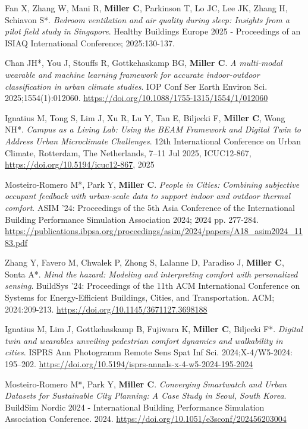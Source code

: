 \documentclass[10pt,a4paper]{article}
\begin{document}
\begin{small}
\begin{etaremune}
\item 
Fan X, Zhang W, Mani R, \textbf{Miller C}, Parkinson T, Lo JC, Lee JK, Zhang H, Schiavon S*. \emph{Bedroom ventilation and air quality during sleep: Insights from a pilot field study in Singapore}. Healthy Buildings Europe 2025 - Proceedings of an ISIAQ International Conference; 2025:130-137.
\item 
Chan JH*, You J, Stouffs R, Gottkehaskamp BG, \textbf{Miller C}. \emph{A multi-modal wearable and machine learning framework for accurate indoor-outdoor classification in urban climate studies}. IOP Conf Ser Earth Environ Sci. 2025;1554(1):012060. \url{https://doi.org/10.1088/1755-1315/1554/1/012060}
\item 
Ignatius M, Tong S, Lim J, Xu R, Lu Y, Tan E, Biljecki F, \textbf{Miller C}, Wong NH*. \emph{Campus as a Living Lab: Using the BEAM Framework and Digital Twin to Address Urban Microclimate Challenges}. 12th International Conference on Urban Climate, Rotterdam, The Netherlands, 7–11 Jul 2025, ICUC12-867, \url{https://doi.org/10.5194/icuc12-867}, 2025
\item 
Mosteiro-Romero M*, Park Y, \textbf{Miller C}. \emph{People in Cities: Combining subjective occupant feedback with urban-scale data to support indoor and outdoor thermal comfort}. ASIM '24: Proceedings of the 5th Asia Conference of the International Building Performance Simulation Association 2024; 2024 pp. 277-284. \url{https://publications.ibpsa.org/proceedings/asim/2024/papers/A18_asim2024_1183.pdf}
\item
Zhang Y, Favero M, Chwalek P, Zhong S, Lalanne D, Paradiso J, \textbf{Miller C}, Sonta A*. \emph{Mind the hazard: Modeling and interpreting comfort with personalized sensing}. BuildSys '24: Proceedings of the 11th ACM International Conference on Systems for Energy-Efficient Buildings, Cities, and Transportation. ACM; 2024:209-213. \url{https://doi.org/10.1145/3671127.3698188}
\item
Ignatius M, Lim J, Gottkehaskamp B, Fujiwara K, \textbf{Miller C}, Biljecki F*.  \emph{Digital twin and wearables unveiling pedestrian comfort dynamics and walkability in cities}. ISPRS Ann Photogramm Remote Sens Spat Inf Sci. 2024;X-4/W5-2024: 195–202. \url{https://doi.org/10.5194/isprs-annals-x-4-w5-2024-195-2024}
\item
Mosteiro-Romero M*, Park Y, \textbf{Miller C}.  \emph{Converging Smartwatch and Urban Datasets for Sustainable City Planning: A Case Study in Seoul, South Korea}. BuildSim Nordic 2024 - International Building Performance Simulation Association Conference. 2024. \url{https://doi.org/10.1051/e3sconf/202456203004}

\end{etaremune}
\end{small}
\end{document}
